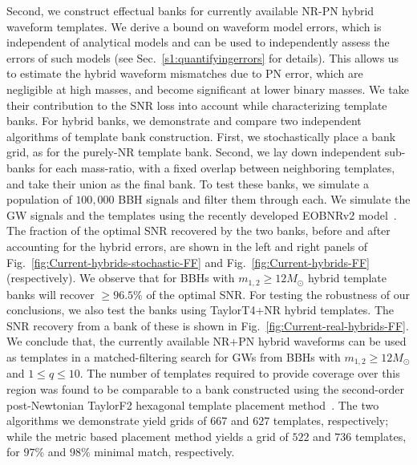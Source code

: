 Second, we construct effectual banks for currently available
NR-PN hybrid waveform templates. We derive a bound on waveform model
errors, which is independent of analytical models and can be used
to independently assess the errors of such models (see
Sec.~\ref{s1:quantifyingerrors} for details). This allows us to estimate
the hybrid waveform mismatches due to PN error, which are negligible
at high masses, and become significant at lower binary masses. We
take their contribution to the SNR loss into account while 
characterizing template banks. For hybrid banks, we demonstrate and 
compare two independent algorithms of template bank construction. 
First, we stochastically
place a bank grid, as for the purely-NR template bank. Second, we lay down
independent sub-banks for each mass-ratio, with a fixed overlap between
neighboring templates, and take their union as the final bank. 
To test these banks, we simulate a population of $100,000$ BBH signals
and filter them through each. We simulate the GW signals and the 
templates using the recently developed EOBNRv2 model~\cite{BuonannoEOBv2Main}. 
The fraction of the optimal SNR recovered by the two banks, before and after
accounting for the hybrid errors, are shown in the left and right panels 
of Fig.~\ref{fig:Current-hybrids-stochastic-FF} and 
Fig.~\ref{fig:Current-hybrids-FF} (respectively).
We observe that for BBHs with $m_{1,2}\geq 12M_\odot$ hybrid template 
banks will recover $\geq 96.5\%$ of the optimal SNR.  For testing the
robustness of our conclusions, we also test the banks using TaylorT4+NR
hybrid templates. The SNR recovery from a bank of these is shown in
Fig.~\ref{fig:Current-real-hybrids-FF}. We conclude that, 
the currently available NR+PN hybrid waveforms can be used as templates in 
a matched-filtering search for GWs from BBHs with $m_{1,2}\geq 12M_\odot$
and $1\leq q\leq 10$. The number of templates required to provide coverage
over this region was found to be comparable to a bank constructed using 
the second-order post-Newtonian TaylorF2 hexagonal template placement 
method~\cite{SathyaBankPlacementTauN,BabaketalBankPlacement,
SathyaMetric2PN,Cokelaer:2007kx}.
The two algorithms we demonstrate yield grids of $667$ and $627$ templates,
respectively; while the metric based placement method yields a grid of $522$ 
and $736$ templates, for $97\%$ and $98\%$ minimal match, respectively.


